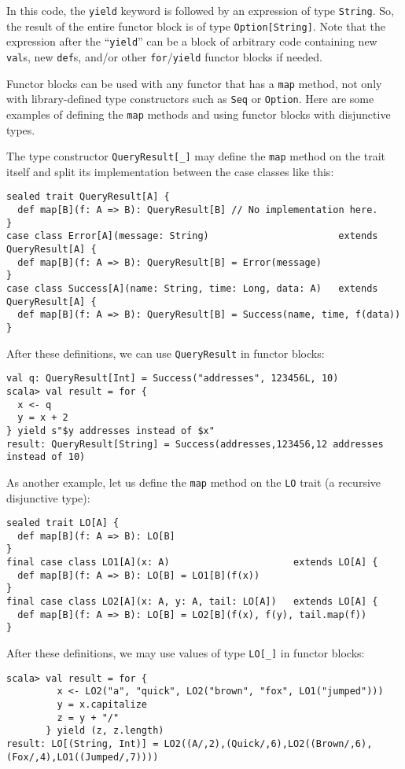 \noindent In this code, the \lstinline!yield! keyword is followed
by an expression of type \lstinline!String!. So, the result of the
entire functor block is of type \lstinline!Option[String]!. Note
that the expression after the \textsf{``}\lstinline!yield!\textsf{''} can be a block
of arbitrary code containing new \lstinline!val!s, new \lstinline!def!s,
and/or other \lstinline!for!/\lstinline!yield! functor blocks if
needed.

Functor blocks can be used with any functor that has a \lstinline!map!
method, not only with library-defined type constructors such as \lstinline!Seq!
or \lstinline!Option!. Here are some examples of defining the \lstinline!map!
methods and using functor blocks with disjunctive types.

The type constructor \lstinline!QueryResult[_]! may define the \lstinline!map!
method on the trait itself and split its implementation between the
case classes like this:
\begin{lstlisting}
sealed trait QueryResult[A] {
  def map[B](f: A => B): QueryResult[B] // No implementation here.
}
case class Error[A](message: String)                       extends QueryResult[A] {
  def map[B](f: A => B): QueryResult[B] = Error(message)
}
case class Success[A](name: String, time: Long, data: A)   extends QueryResult[A] {
  def map[B](f: A => B): QueryResult[B] = Success(name, time, f(data))
}
\end{lstlisting}
After these definitions, we can use \lstinline!QueryResult! in functor
blocks:
\begin{lstlisting}
val q: QueryResult[Int] = Success("addresses", 123456L, 10)
scala> val result = for {
  x <- q
  y = x + 2
} yield s"$y addresses instead of $x"
result: QueryResult[String] = Success(addresses,123456,12 addresses instead of 10)
\end{lstlisting}

As another example, let us define the \lstinline!map! method on the
\lstinline!LO! trait (a recursive disjunctive type):
\begin{lstlisting}
sealed trait LO[A] {
  def map[B](f: A => B): LO[B]
}
final case class LO1[A](x: A)                      extends LO[A] {
  def map[B](f: A => B): LO[B] = LO1[B](f(x))
}
final case class LO2[A](x: A, y: A, tail: LO[A])   extends LO[A] {
  def map[B](f: A => B): LO[B] = LO2[B](f(x), f(y), tail.map(f))
}
\end{lstlisting}
After these definitions, we may use values of type \lstinline!LO[_]!
in functor blocks:
\begin{lstlisting}
scala> val result = for {
         x <- LO2("a", "quick", LO2("brown", "fox", LO1("jumped")))
         y = x.capitalize
         z = y + "/"
       } yield (z, z.length)
result: LO[(String, Int)] = LO2((A/,2),(Quick/,6),LO2((Brown/,6),(Fox/,4),LO1((Jumped/,7))))
\end{lstlisting}


